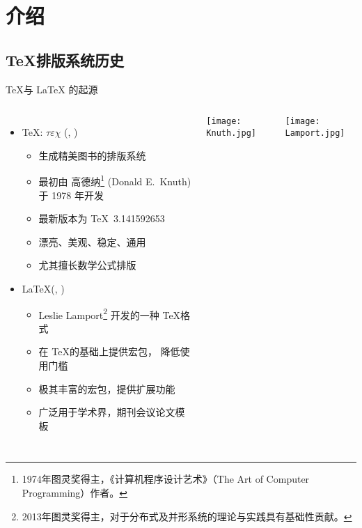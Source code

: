 \section{介绍}

\subsection{\TeX 排版系统历史}

\begin{frame}[fragile]{\TeX 与 \LaTeX{} 的起源}
  \begin{columns}[T]
    \begin{itemize}
      \item \TeX: $\tau\varepsilon\chi$ (,
        )
        \begin{itemize}
          \item 生成精美图书的排版系统
          \item 最初由 高德纳\footnote{1974年图灵奖得主，《计算机程序设计艺术》（The Art of Computer Programming）作者。} (Donald E.~Knuth) 于 1978 年开发  
          \item 最新版本为 \TeX\ 3.141592653
          \item 漂亮、美观、稳定、通用
          \item 尤其擅长数学公式排版
        \end{itemize}
        \vspace{2em}
      \item \LaTeX{}(, )
        \begin{itemize}
          \item Leslie Lamport\footnote{2013年图灵奖得主，对于分布式及并形系统的理论与实践具有基础性贡献。} 开发的一种 \TeX 格式
          \item 在 \TeX 的基础上提供宏包， 降低使用门槛
          \item 极其丰富的宏包，提供扩展功能
          \item 广泛用于学术界，期刊会议论文模板
        \end{itemize}
    \end{itemize}
    \vspace*{-5mm}
    \texttt{[image: Knuth.jpg]}

    \texttt{[image: Lamport.jpg]}

  \end{columns}
\end{frame}

